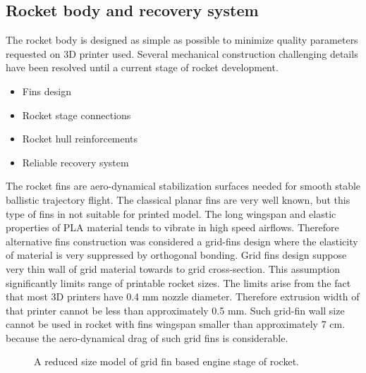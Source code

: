 \documentclass{poster16}
\begin{document}
\subsection{Rocket body and recovery system}

The rocket body is designed as simple as possible to minimize quality parameters requested on 3D printer used. Several mechanical construction challenging details have been resolved until a current stage of rocket development. 

\begin{itemize}
\item Fins design
\item Rocket stage connections
\item Rocket hull reinforcements
\item Reliable recovery system
\end{itemize}

The rocket fins are aero-dynamical stabilization surfaces needed for smooth stable ballistic trajectory flight.  The classical planar fins are very well known, but this type of fins in not suitable for printed model.  The long wingspan and elastic properties of PLA material tends to vibrate in high speed airflows.
Therefore alternative fins construction was considered a grid-fins design \cite{grid_fins} where the elasticity of material is very suppressed by orthogonal bonding.
Grid fins design suppose very thin wall of grid material towards to grid cross-section. This assumption significantly limits range of printable rocket sizes. The limits arise from the fact that most 3D printers have 0.4 mm nozzle diameter. Therefore extrusion width of that printer cannot be less than approximately 0.5 mm. Such grid-fin wall size cannot be used in rocket with fins wingspan smaller than approximately 7 cm. because the aero-dynamical drag of such grid fins is considerable. 

\begin{figure}[ht]
\begin{center}
\caption{A reduced size model of grid fin based engine stage of rocket. } 
\label{fig:grid_fin}
\end{center}
\end{figure}
\end{document}
